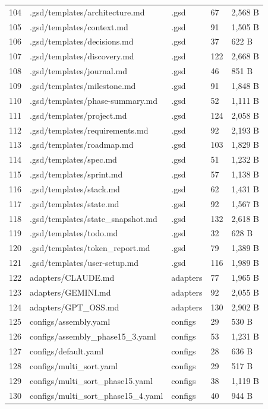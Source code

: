 \documentclass[11pt,a4paper,oneside]{book}
\begin{document}
\begin{longtable}{l l l l l}
104 & .gsd/templates/architecture.md & .gsd & 67 & 2,568 B \\
105 & .gsd/templates/context.md & .gsd & 91 & 1,505 B \\
106 & .gsd/templates/decisions.md & .gsd & 37 & 622 B \\
107 & .gsd/templates/discovery.md & .gsd & 122 & 2,668 B \\
108 & .gsd/templates/journal.md & .gsd & 46 & 851 B \\
109 & .gsd/templates/milestone.md & .gsd & 91 & 1,848 B \\
110 & .gsd/templates/phase-summary.md & .gsd & 52 & 1,111 B \\
111 & .gsd/templates/project.md & .gsd & 124 & 2,058 B \\
112 & .gsd/templates/requirements.md & .gsd & 92 & 2,193 B \\
113 & .gsd/templates/roadmap.md & .gsd & 103 & 1,829 B \\
114 & .gsd/templates/spec.md & .gsd & 51 & 1,232 B \\
115 & .gsd/templates/sprint.md & .gsd & 57 & 1,138 B \\
116 & .gsd/templates/stack.md & .gsd & 62 & 1,431 B \\
117 & .gsd/templates/state.md & .gsd & 92 & 1,567 B \\
118 & .gsd/templates/state\_snapshot.md & .gsd & 132 & 2,618 B \\
119 & .gsd/templates/todo.md & .gsd & 32 & 628 B \\
120 & .gsd/templates/token\_report.md & .gsd & 79 & 1,389 B \\
121 & .gsd/templates/user-setup.md & .gsd & 116 & 1,989 B \\
122 & adapters/CLAUDE.md & adapters & 77 & 1,965 B \\
123 & adapters/GEMINI.md & adapters & 92 & 2,055 B \\
124 & adapters/GPT\_OSS.md & adapters & 130 & 2,902 B \\
125 & configs/assembly.yaml & configs & 29 & 530 B \\
126 & configs/assembly\_phase15\_3.yaml & configs & 53 & 1,231 B \\
127 & configs/default.yaml & configs & 28 & 636 B \\
128 & configs/multi\_sort.yaml & configs & 29 & 517 B \\
129 & configs/multi\_sort\_phase15.yaml & configs & 38 & 1,119 B \\
130 & configs/multi\_sort\_phase15\_4.yaml & configs & 40 & 944 B \\

\end{longtable}
\end{document}
